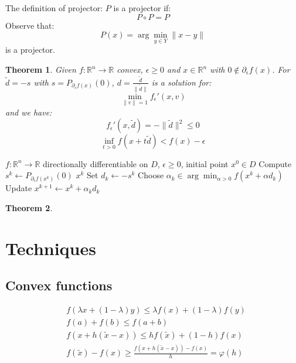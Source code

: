 \documentclass[a4paper,11pt,fleqn, draft]{book}
\newtheorem{theorem}{Theorem}[section]
\theoremstyle{definition}
\theoremstyle{remark}
\begin{document}
The definition of projector: $P$ is a projector if:
\begin{equation*}
	P \circ P = P
\end{equation*}
Observe that:
\begin{equation*}
	P(x) = \arg \min_{y \in Y} \| x - y \|
\end{equation*}
is a projector.


\begin{theorem}
Given $f: \mathbb{R}^n \rightarrow \mathbb{R}$ convex, $\epsilon \geq 0$ and $ x \in \mathbb{R}^n$ with $0 \notin \partial_\epsilon f(x)$. For $\tilde{d} = -s$ with $s = P_{\partial_\epsilon f(x)} (0)$, $d = \frac{\tilde{d}}{\|\tilde{d}\|}$ is a solution for:
\begin{equation*}
	\min_{\|v\| = 1} f_\epsilon'(x, v)
\end{equation*}
and we have:
\begin{equation*}
	f_\epsilon'(x, \tilde{d}) = - \|\tilde{d}\|^2 \leq 0
\end{equation*}
\begin{equation*}
	\inf_{t > 0} f(x + t\tilde{d}) < f(x) - \epsilon
\end{equation*}
\end{theorem}

\begin{algorithm}
\caption{$\epsilon$-subdifferential algorithm}
\begin{algorithmic}[1]
\Require $f:\mathbb{R}^n\to\mathbb{R}$ directionally differentiable on $D$, $\epsilon\ge 0$, initial point $x^0\in D$
  \State Compute $s^k \gets P_{\partial_\epsilon f(x^k)}(0)$
    \State \Return $x^k$
  \EndIf
  \State Set $d_k \gets -s^k$
  \State Choose $\alpha_k \in \arg\min_{\alpha>0} f(x^k + \alpha d_k)$
  \State Update $x^{k+1} \gets x^k + \alpha_k d_k$
\EndFor
\end{algorithmic}
\end{algorithm}

\begin{theorem}
\end{theorem}


\section{Techniques}
\subsection{Convex functions}
\begin{align}
	&f(\lambda x + (1 - \lambda)y) \leq \lambda f(x) + (1 - \lambda) f(y)\\
	&f(a) + f(b) \leq f(a + b)\\
	&f(x + h(\tilde{x} - x)) \leq h f(\tilde{x}) + (1 - h)f(x)\\
	&f(\tilde{x}) - f(x) \geq \frac{f(x + h(\tilde{x} - x)) - f(x)}{h} = \varphi(h)
\end{align}
\end{document}
